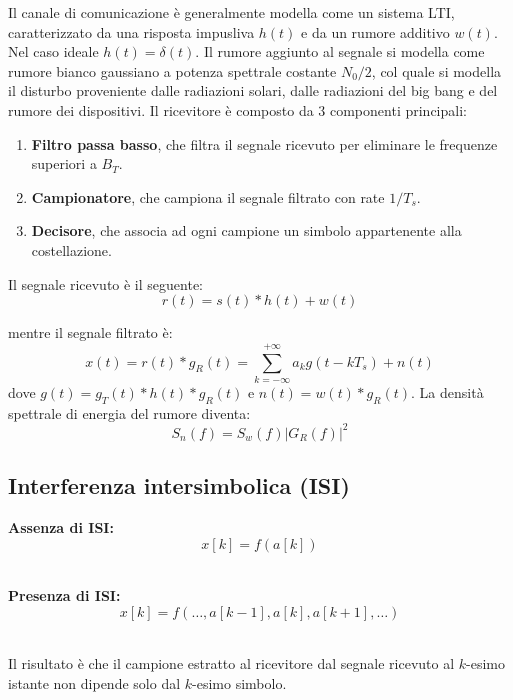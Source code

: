 Il canale di comunicazione è generalmente modella come un sistema LTI, caratterizzato da una risposta impusliva $h(t)$ e da un rumore additivo $w(t)$.
Nel caso ideale $h(t) = \delta (t)$.
Il rumore aggiunto al segnale si modella come rumore bianco gaussiano a potenza spettrale costante $N_0/2$, col quale si modella il disturbo proveniente dalle radiazioni solari, dalle radiazioni del big bang e del rumore dei dispositivi.
Il ricevitore è composto da 3 componenti principali:
\begin{enumerate}
    \item \textbf{Filtro passa basso}, che filtra il segnale ricevuto per eliminare le frequenze superiori a $B_T$.
    \item \textbf{Campionatore}, che campiona il segnale filtrato con rate $1/T_s$. 
    \item \textbf{Decisore}, che associa ad ogni campione un simbolo appartenente alla costellazione.
\end{enumerate}
Il segnale ricevuto è il seguente:
\[
    r(t) = s(t) \ast h(t) + w(t)
\]

mentre il segnale filtrato è:
\[
    x(t) = r(t) \ast g_R(t) = \sum_{k=-\infty}^{+\infty} a_k g(t - kT_s) + n(t)
\]
dove $g(t) = g_T(t) \ast h(t) \ast g_R(t)$ e $n(t) = w(t) \ast g_R(t)$. La densità spettrale di energia del rumore diventa:
\[
    S_n(f) = S_w(f) |G_R(f)|^2
\]



\subsection*{Interferenza intersimbolica (ISI)}
\noindent
\begin{minipage}{.5\textwidth}
    \centering
    \textbf{Assenza di ISI:}
    \[
        x[k] = f(a[k])
    \]
    \\
\end{minipage}%
\begin{minipage}{.5\textwidth}
    \centering
    \textbf{Presenza di ISI:}
    \[
        x[k] = f(\dots, a[k-1], a[k], a[k+1], \dots)
    \]
    \\
\end{minipage}


Il risultato è che il campione estratto al ricevitore dal segnale ricevuto al $k$-esimo istante non dipende solo dal $k$-esimo simbolo.

